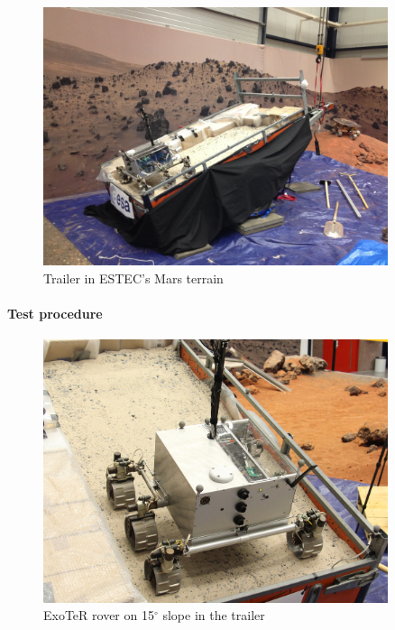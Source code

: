 \documentclass[a4paper,twocolumn]{esapub2005} %
\begin{document}



\begin{figure}[h!]
	\centering		\includegraphics[width=0.9\textwidth]{trailersetup.JPG}	
	\caption{Trailer in ESTEC's Mars terrain}
	\label{fig:trailer}
\end{figure}


\paragraph{Test procedure}



\begin{figure}[h!]
	\centering		\includegraphics[width=0.9\textwidth]{Exoslope.JPG}	
	\caption{ExoTeR rover on 15$^{\circ}$ slope in the trailer}
	\label{fig:Exoslope}
\end{figure}
\end{document}
